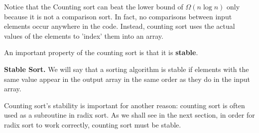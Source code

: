 Notice that the Counting sort can beat the lower bound of $\Omega\left(n \log n\right)$ only because it is not a comparison sort. In fact, no comparisons between input elements occur anywhere in the code. Instead, counting sort uses the actual values of the elements to 'index' them into an array.

An important property of the counting sort is that it is \textbf{stable}.

\begin{framed}\textbf{Stable Sort.}
 We will say that a sorting algorithm is stable if elements with the same value appear in the output array in the same order as they do in the input array. \end{framed}

Counting sort's stability is important for another reason: counting sort is often used as a subroutine in radix sort. As we shall see in the next section, in order for radix sort to work correctly, counting sort must be stable.

